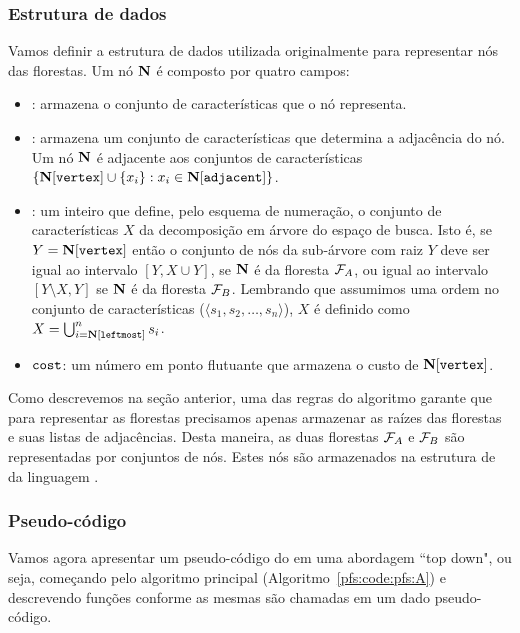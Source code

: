 \subsubsection{Estrutura de dados}
Vamos definir a estrutura de dados utilizada originalmente para representar
nós das florestas. Um nó $\mathbf N$ é composto por quatro campos:
\begin{itemize}
    \item{:} armazena o conjunto de características que 
        o nó representa. 
    \item{:} armazena um conjunto de características
        que determina a adjacência do nó. Um nó $\mathbf N$ é 
        adjacente aos conjuntos de características 
        $\{\mathbf N[\texttt{vertex}] \cup \{x_i\} : x_i \in \mathbf N[\texttt{adjacent}]\}$.
    \item{}: um inteiro que define, pelo esquema de
        numeração, o conjunto de características $X$ da decomposição
        em árvore do espaço de busca. Isto é, se
        $Y = \mathbf N[\texttt{vertex}]$ então o conjunto de nós da 
        sub-árvore com raiz $Y$ deve ser igual ao intervalo 
        $[Y, X \cup Y]$, se $\mathbf N$ é da floresta $\mathcal{F}_A$, ou
        igual ao intervalo $[Y \setminus X, Y]$ se $\mathbf N$ é da 
        floresta $\mathcal{F}_B$. Lembrando que assumimos uma ordem no 
        conjunto de características ($\langle s_1, s_2, \dots, 
        s_n\rangle$), $X$ é definido como 
            $X = \bigcup_{i = \mathbf N[\texttt{leftmost}]}^{n} s_i$.
    \item{$\texttt{cost}$:} um número em ponto flutuante que armazena
        o custo de $\mathbf N[\texttt{vertex}]$.
\end{itemize}

Como descrevemos na seção anterior, uma das regras do algoritmo garante
que para representar as florestas precisamos apenas armazenar as raízes
das florestas e suas listas de adjacências. Desta maneira, as duas 
florestas $\mathcal{F}_A$ e $\mathcal{F}_B$ são representadas por conjuntos de
nós. Estes nós são armazenados na estrutura de  da 
linguagem . 

\subsubsection{Pseudo-código}
Vamos agora apresentar um pseudo-código do  em uma 
abordagem ``top down", ou seja, começando pelo algoritmo principal (Algoritmo~\ref{pfs:code:pfs:A}) e descrevendo funções conforme as mesmas são chamadas em um dado pseudo-código.

